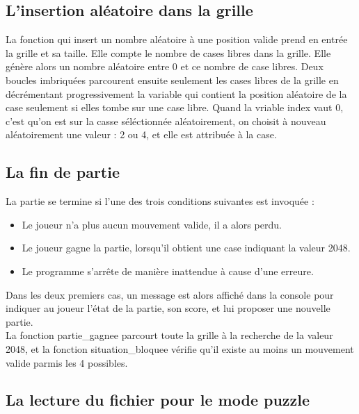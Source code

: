 \documentclass[12pt]{article}
\begin{document}
\subsection{L'insertion aléatoire dans la grille}

\indent La fonction qui insert un nombre aléatoire à une position valide prend en entrée la grille et sa taille. Elle compte le nombre de cases libres dans la grille. Elle génère alors un nombre aléatoire entre 0 et ce nombre de case libres. Deux boucles imbriquées parcourent ensuite seulement les cases libres de la grille en décrémentant progressivement la variable qui contient la position aléatoire de la case seulement si elles tombe sur une case libre. Quand la vriable index vaut 0, c'est qu'on est sur la casse séléctionnée aléatoirement, on choisit à nouveau aléatoirement une valeur : 2 ou 4, et elle est attribuée à la case.

\subsection{La fin de partie}

\indent La partie se termine si l'une des trois conditions suivantes est invoquée :\\
\begin{itemize}
    \item Le joueur n'a plus aucun mouvement valide, il a alors perdu. 
    \item Le joueur gagne la partie, lorsqu'il obtient une case indiquant la valeur 2048.
    \item Le programme s'arrête de manière inattendue à cause d'une erreure.\\
\end{itemize}
Dans les deux premiers cas, un message est alors affiché dans la console pour indiquer au joueur l'état de la partie, son score, et lui proposer une nouvelle partie.\\
La fonction partie\_gagnee parcourt toute la grille à la recherche de la valeur 2048, et la fonction situation\_bloquee vérifie qu'il existe au moins un mouvement valide parmis les 4 possibles.

\subsection{La lecture du fichier pour le mode puzzle}
\end{document}
